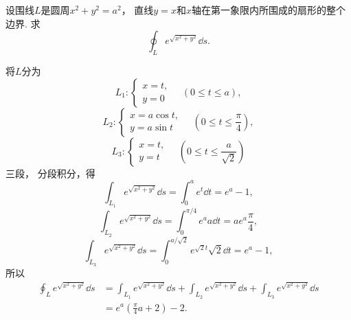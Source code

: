 \begin{example}
设围线\(L\)是圆周\(x^2+y^2=a^2\)，
直线\(y=x\)和\(x\)轴在第一象限内所围成的扇形的整个边界.
求\begin{equation*}
	\oint_L e^{\sqrt{x^2+y^2}} \dd{s}.
\end{equation*}
\begin{solution}
将\(L\)分为\begin{equation*}
	L_1: \left\{ \begin{array}{l}
		x = t, \\
		y = 0
	\end{array} \right.
	\quad(0 \leq t \leq a),
\end{equation*}\begin{equation*}
	L_2: \left\{ \begin{array}{l}
		x = a \cos t, \\
		y = a \sin t
	\end{array} \right.
	\quad(0 \leq t \leq \frac{\pi}{4}),
\end{equation*}\begin{equation*}
	L_3: \left\{ \begin{array}{l}
		x = t, \\
		y = t
	\end{array} \right.
	\quad(0 \leq t \leq \frac{a}{\sqrt{2}})
\end{equation*}三段，
分段积分，得\begin{equation*}
	\int_{L_1} e^{\sqrt{x^2+y^2}} \dd{s}
	= \int_0^a e^t \dd{t}
	= e^a-1,
\end{equation*}\begin{equation*}
	\int_{L_2} e^{\sqrt{x^2+y^2}} \dd{s}
	= \int_0^{\pi/4} e^a a \dd{t}
	= a e^a \frac{\pi}{4},
\end{equation*}\begin{equation*}
	\int_{L_3} e^{\sqrt{x^2+y^2}} \dd{s}
	= \int_0^{a/\sqrt{2}} e^{\sqrt{2}t} \sqrt{2} \dd{t}
	= e^a-1,
\end{equation*}
所以\begin{align*}
	\oint_L e^{\sqrt{x^2+y^2}} \dd{s}
	&= \int_{L_1} e^{\sqrt{x^2+y^2}} \dd{s}
	+ \int_{L_2} e^{\sqrt{x^2+y^2}} \dd{s}
	+ \int_{L_3} e^{\sqrt{x^2+y^2}} \dd{s} \\
	&= e^a \left(\frac{\pi}{4}a + 2\right) - 2.
\end{align*}
\end{solution}
\end{example}

